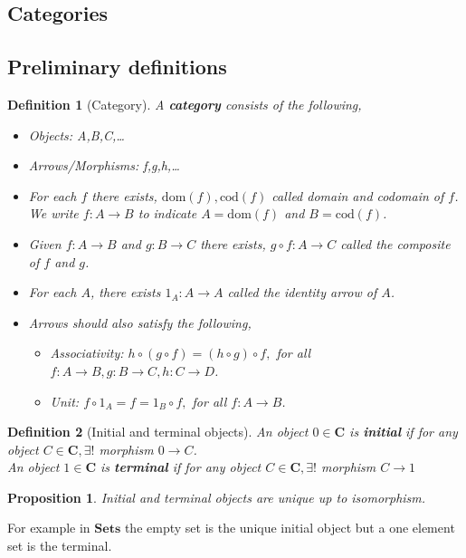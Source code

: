 \documentclass[12pt]{article}
\numberwithin{equation}{section}
\newtheorem{definition}{Definition}[section]
\newtheorem{proposition}{Proposition}[section]
\begin{document}
	\clearpage
	\begin{appendices}
		\section{Categories}
		\subsection{Preliminary definitions}
		\begin{definition}[Category]
			A \textbf{category} consists of the following,
			\begin{itemize}
				\item Objects: A,B,C,\dots
				\item Arrows/Morphisms: f,g,h,\dots
				\item For each $ f $ there exists, $ \mathrm{dom}(f) , \mathrm{cod}(f)$ called domain and codomain of $ f $. We write $ f: A \to B $ to indicate $ A=\mathrm{dom}(f) $ and $ B=\mathrm{cod}(f) $.
				\item Given  $ f: A \to B$ and $ g: B \to C $ there exists, $ g \circ f: A \to C $ called the \textit{composite} of $ f $ and $ g $.
				\item For each $ A $, there exists $ 1_A:A\to A $ called the \textit{identity arrow} of $ A $.
				\item Arrows should also satisfy the following,
				\begin{itemize}
					\item Associativity: $ h \circ(g \circ f) = (h \circ g) \circ f,$ for all $ f:A \to B, g:B \to C, h: C \to D $.
					\item Unit: $ f\circ 1_A=f=1_B\circ f, $ for all $ f:A \to B $.	
				\end{itemize}
			\end{itemize}
		\end{definition}
		
		\begin{definition}[Initial and terminal objects]
			An object $ 0 \in \mathbf{C} $ is \textbf{initial} if for any object $ C \in \mathbf{C}, \exists!$ morphism $ 0 \to C $.\\
			An object $ 1 \in \mathbf{C} $ is \textbf{terminal} if for any object $ C \in \mathbf{C}, \exists!$ morphism $ C \to 1 $
		\end{definition}
		\begin{proposition}
			Initial and terminal objects are unique up to isomorphism.
		\end{proposition}
		For example in $\mathbf{Sets}$ the empty set is the unique initial object but a one element set is the terminal.
		

\end{appendices}
\end{document}

